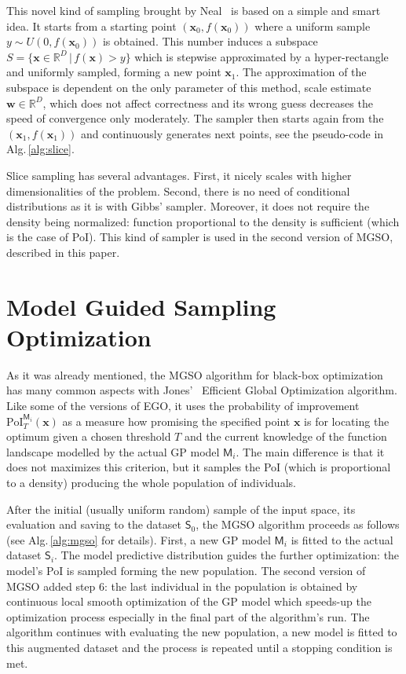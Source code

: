 \documentclass{itatnew}
\newcommand{\xx}{\mathrm{\mathbf{x}}}
\begin{document}
This novel kind of sampling brought by Neal~\cite{neal_slice_2003} is based on a simple and smart idea. It starts from a starting point $(\xx_0, f(\xx_0))$ where a uniform sample $y \sim U(0,f(\xx_0))$ is obtained. This number induces a subspace $S=\{\xx \in \mathbb{R}^D \,|\, f(\xx) > y\}$ which is stepwise approximated by a hyper-rectangle and uniformly sampled, forming a new point $\xx_1$. The approximation of the subspace is dependent on the only parameter of this method, scale estimate $\mathbf{w} \in \mathbb{R}^D$, which does not affect correctness and its wrong guess decreases the speed of convergence only moderately. The sampler then starts again from the $(\xx_1, f(\xx_1))$ and continuously generates next points, see the pseudo-code in Alg.\,\ref{alg:slice}.

Slice sampling has several advantages. First, it nicely scales with higher dimensionalities of the problem. Second, there is no need of conditional distributions as it is with Gibbs' sampler. Moreover, it does not require the density being normalized: function proportional to the density is sufficient (which is the case of PoI). This kind of sampler is used in the second version of MGSO, described in this paper.


\section{Model Guided Sampling Optimization}
\label{sec:mgso}

As it was already mentioned, the MGSO algorithm for black-box optimization has many common aspects with Jones'~\cite{jones_efficient_1998} Efficient Global Optimization algorithm. Like some of the versions of EGO, it uses the probability of improvement $\mathrm{PoI}_T^{\mathsf{M}_i}(\xx)$ as a measure how promising the specified point $\xx$ is for locating the optimum given a chosen threshold $T$ and the current knowledge of the function landscape
modelled by the actual GP model $\mathsf{M}_i$. The main difference is that it does not maximizes this criterion, but it samples the PoI (which is proportional to a density) producing the whole population of individuals. 

After the initial (usually uniform random) sample of the input space, its evaluation and saving to the dataset $\mathsf{S}_0$, the MGSO algorithm proceeds as follows (see Alg.\,\ref{alg:mgso} for details). First, a new GP model $\mathsf{M}_i$ is fitted to the actual dataset $\mathsf{S}_i$. The model predictive distribution guides the further optimization: the model's PoI is sampled forming the new population. The second version of MGSO added step 6: the last individual in the population is obtained by continuous local smooth optimization of the GP model which speeds-up the optimization process especially in the final part of the algorithm's run. The algorithm continues with evaluating the new population, a new model is fitted to this augmented dataset and the process is repeated until a stopping condition is met.
\end{document}
